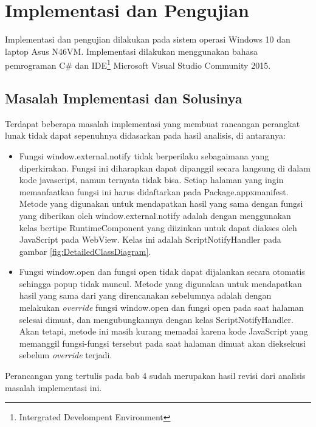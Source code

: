 \chapter{Implementasi dan Pengujian}
\label{chap:implementasi_pengujian}

Implementasi dan pengujian dilakukan pada sistem operasi Windows 10 dan laptop Asus N46VM. Implementasi dilakukan menggunakan bahasa pemrograman C\# dan IDE\footnote{Intergrated Develompent Environment} Microsoft Visual Studio Community 2015.

\section{Masalah Implementasi dan Solusinya}
\label{sec:masalah_implementasi}

Terdapat beberapa masalah implementasi yang membuat rancangan perangkat lunak tidak dapat sepenuhnya didasarkan pada hasil analisis, di antaranya:

\begin{itemize}
    \item{Fungsi window.external.notify tidak berperilaku sebagaimana yang diperkirakan. Fungsi ini diharapkan dapat dipanggil secara langsung di dalam kode javascript, namun ternyata tidak bisa. Setiap halaman yang ingin memanfaatkan fungsi ini harus didaftarkan pada Package.appxmanifest. Metode yang digunakan untuk mendapatkan hasil yang sama dengan fungsi yang diberikan oleh window.external.notify adalah dengan menggunakan kelas bertipe RuntimeComponent yang diizinkan untuk dapat diakses oleh JavaScript pada WebView. Kelas ini adalah ScriptNotifyHandler pada gambar \ref{fig:DetailedClassDiagram}.}
    \item{Fungsi window.open dan fungsi open tidak dapat dijalankan secara otomatis sehingga popup tidak muncul. Metode yang digunakan untuk mendapatkan hasil yang sama dari yang direncanakan sebelumnya adalah dengan melakukan \textit{override} fungsi window.open dan fungsi open pada saat halaman selesai dimuat, dan mengubungkannya dengan kelas ScriptNotifyHandler. Akan tetapi, metode ini masih kurang memadai karena kode JavaScript yang memanggil fungsi-fungsi tersebut pada saat halaman dimuat akan dieksekusi sebelum \textit{override} terjadi.}
\end{itemize}

Perancangan yang tertulis pada bab 4 sudah merupakan hasil revisi dari analisis masalah implementasi ini.



